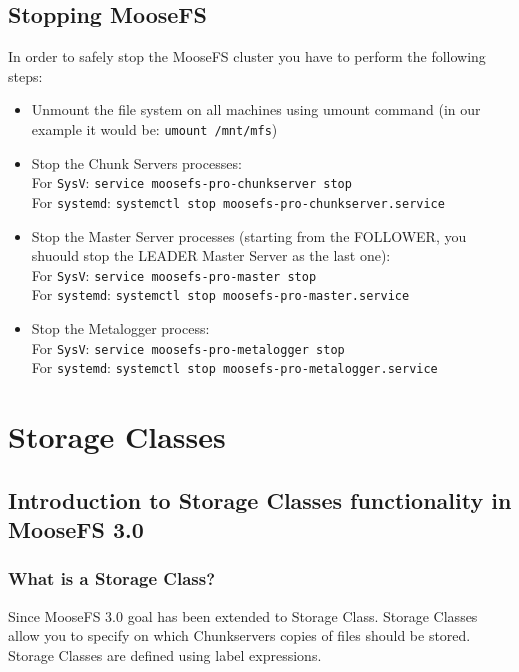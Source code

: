 \documentclass[a4paper,11pt,english]{report}
\def\code#1{\texttt{#1}}
\begin{document}
	
		\section{Stopping MooseFS}
		In order to safely stop the MooseFS cluster you have to perform the following steps:
		\begin{itemize}
			\item Unmount the file system on all machines using umount command (in our example it would be: \code{umount /mnt/mfs})
			\item Stop the Chunk Servers processes:\\
				For \code{SysV}: \code{service moosefs-pro-chunkserver stop}\\
				For \code{systemd}: \code{systemctl stop moosefs-pro-chunkserver.service}
				 
			\item Stop the Master Server processes (starting from the FOLLOWER, you shuould stop the LEADER Master Server as the last one):\\
				For \code{SysV}: \code{service moosefs-pro-master stop}\\
				For \code{systemd}: \code{systemctl stop moosefs-pro-master.service}			
			
			\item Stop the Metalogger process:\\
				For \code{SysV}: \code{service moosefs-pro-metalogger stop}\\
				For \code{systemd}: \code{systemctl stop moosefs-pro-metalogger.service}		
		\end{itemize}	
	
	
	\chapter{Storage Classes}
		\section{Introduction to Storage Classes functionality in MooseFS 3.0}
			
			\subsection{What is a Storage Class?}
			Since MooseFS 3.0 goal has been extended to Storage Class. Storage Classes allow you to specify on which Chunkservers copies of files should be stored. Storage Classes are defined using label expressions.
			
\end{document}
